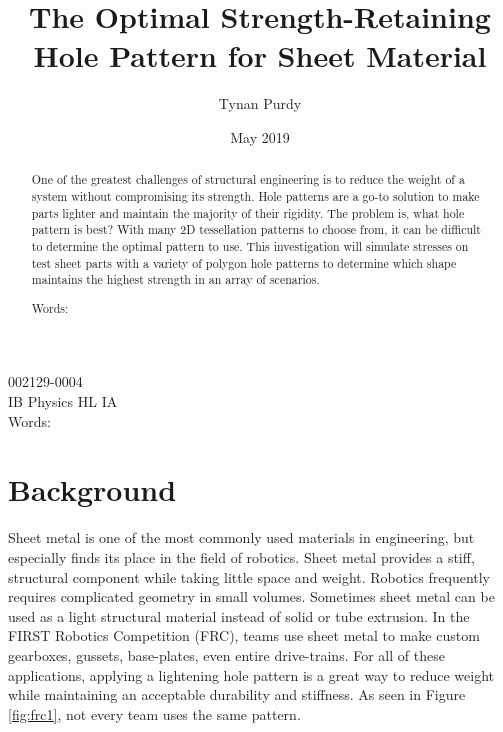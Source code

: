 \documentclass[12pt, letterpaper]{article}
\title{The Optimal Strength-Retaining Hole Pattern for Sheet Material}
\author{Tynan Purdy}
\date{May 2019}
\begin{document}
\large
\doublespace{}
\parindent=0.5in

{\fontsize{12}{14.4}
  {\singlespace
    \maketitle
    \begin{center}
    002129-0004 \\
    \vspace{4mm}
    IB Physics HL IA \\
    \vspace{4mm}
    Words:  \\ %
    \end{center}
  }
}	

\newpage
{}

\begin{abstract}
One of the greatest challenges of structural engineering is to reduce the weight of a system without compromising its strength. Hole patterns are a go-to solution to make parts lighter and maintain the majority of their rigidity. The problem is, what hole pattern is best? With many 2D tessellation patterns to choose from, it can be difficult to determine the optimal pattern to use. This investigation will simulate stresses on test sheet parts with a variety of polygon hole patterns to determine which shape maintains the highest strength in an array of scenarios. 

Words: %

\end{abstract}

\newpage
\tableofcontents
\newpage

\section{Background}
\label{sec:background}

Sheet metal is one of the most commonly used materials in engineering, but especially finds its place in the field of robotics. Sheet metal provides a stiff, structural component while taking little space and weight. Robotics frequently requires complicated geometry in small volumes. Sometimes sheet metal can be used as a light structural material instead of solid or tube extrusion. In the FIRST Robotics Competition (FRC), teams use sheet metal to make custom gearboxes, gussets, base-plates, even entire drive-trains. For all of these applications, applying a lightening hole pattern is a great way to reduce weight while maintaining an acceptable durability and stiffness. As seen in Figure \ref{fig:frc1}, not every team uses the same pattern.
\end{document}
